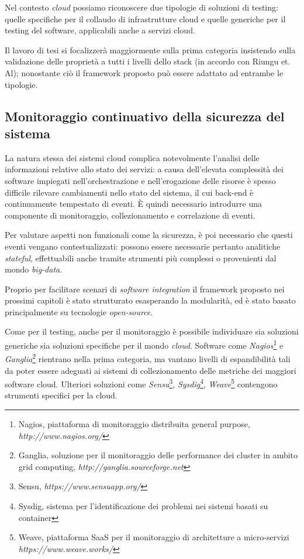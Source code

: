 \documentclass[../main.tex]{subfiles}
\begin{document}
Nel contesto \textit{cloud} possiamo riconoscere due tipologie di soluzioni di testing: quelle specifiche per il collaudo di infrastrutture cloud e quelle generiche per il testing del software, applicabili anche a servizi cloud.


Il lavoro di tesi si focalizzerà maggiormente sulla prima categoria insistendo sulla validazione delle proprietà a tutti i livelli dello stack (in accordo con Riungu et. Al\cite{Ieee5708500}); nonostante ciò il framework proposto può essere adattato ad entrambe le tipologie.


\subsection{Monitoraggio continuativo della sicurezza del sistema}
La natura stessa dei sistemi cloud complica notevolmente l'analisi delle informazioni relative allo stato dei servizi: a causa dell'elevata complessità dei software impiegati nell'orchestrazione e nell'erogazione delle risorse è spesso difficile rilevare cambiamenti nello stato del sistema, il cui back-end è continuamente tempestato di eventi.
È quindi necessario introdurre una componente di monitoraggio, collezionamento e correlazione di eventi.


Per valutare aspetti non funzionali come la sicurezza, è poi necessario che questi eventi vengano contestualizzati: possono essere necessarie pertanto analitiche \textit{stateful}, effettuabili anche tramite strumenti più complessi o provenienti dal mondo \textit{big-data}. 


Proprio per facilitare scenari di \textit{software integration} il framework proposto nei prossimi capitoli è stato strutturato esasperando la modularità, ed è stato basato principalmente su tecnologie \textit{open-source}.


Come per il testing, anche per il monitoraggio è possibile individuare sia soluzioni generiche sia soluzioni specifiche per il mondo \textit{cloud}. Software come \textit{Nagios}\footnote{Nagios, piattaforma di monitoraggio distribuita general purpose, \textit{http://www.nagios.org/}} e \textit{Ganglia}\footnote{Ganglia, soluzione per il monitoraggio delle performance dei cluster in ambito grid computing, \textit{http://ganglia.sourceforge.net}} rientrano nella prima categoria, ma vantano livelli di espandibilità tali da poter essere adeguati ai sistemi di collezionamento delle metriche dei maggiori software cloud.
Ulteriori soluzioni come \textit{Sensu}\footnote{Sensu, \textit{https://www.sensuapp.org/}}, \textit{Sysdig}\footnote{Sysdig, sistema per l'identificazione dei problemi nei sistemi basati su container}, \textit{Weave}\footnote{Weave, piattaforma SaaS per il monitoraggio di architetture a micro-servizi \textit{https://www.weave.works/}} contengono strumenti specifici per la cloud.
\end{document}
